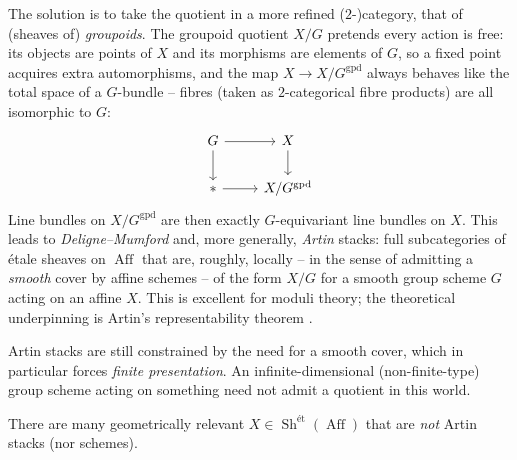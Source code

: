 \begin{remark}
\label{rmk:15:groupoid-quotient}
The solution is to take the quotient in a more refined ($2$-)category, that of
(sheaves of) \emph{groupoids}. The groupoid quotient $X/G$ pretends every action is
free: its objects are points of $X$ and its morphisms are elements of $G$, so a
fixed point acquires extra automorphisms, and the map $X\to X/G^{\mathrm{gpd}}$
always behaves like the total space of a $G$-bundle -- fibres (taken as
$2$-categorical fibre products) are all isomorphic to $G$:
\begin{equation*}
\begin{tikzcd}
G \arrow[r] \arrow[d] & X \arrow[d] \\
\ast \arrow[r] & X/G^{\mathrm{gpd}}
\end{tikzcd}
\end{equation*}
Line bundles on $X/G^{\mathrm{gpd}}$ are then exactly $G$-equivariant line bundles on
$X$. This leads to \emph{Deligne--Mumford} and, more generally, \emph{Artin} stacks:
full subcategories of \'etale sheaves on $\operatorname{Aff}$ that are, roughly,
locally -- in the sense of admitting a \emph{smooth} cover by affine schemes --
of the form $X/G$ for a smooth group scheme $G$ acting on an affine $X$. This is
excellent for moduli theory; the theoretical underpinning is Artin's
representability theorem \cite{Artin_1974}.
\end{remark}

\begin{remark}
\label{rmk:15:smooth-forces-ft}
Artin stacks are still constrained by the need for a smooth cover, which in
particular forces \emph{finite presentation}. An infinite-dimensional (non-finite-type)
group scheme acting on something need not admit a quotient in this world.
\end{remark}

There are many geometrically relevant $X\in \operatorname{Sh}^{\text{\'et}}(\operatorname{Aff})$
that are \emph{not} Artin stacks (nor schemes).

